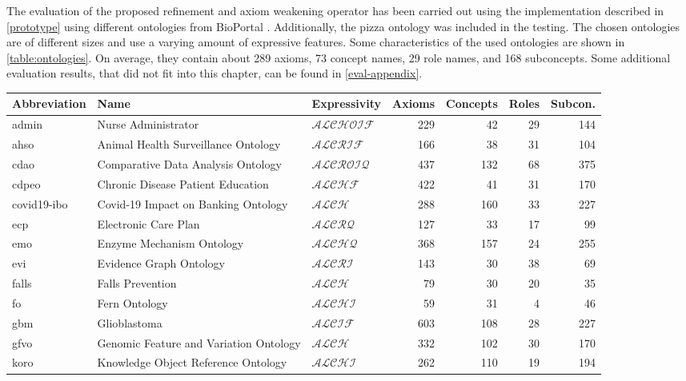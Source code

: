 
The evaluation of the proposed refinement and axiom weakening operator has been carried out using the implementation described in \cref{prototype} using different ontologies from BioPortal \cite{whetzel2011bioportal,bioportal}. Additionally, the pizza ontology \cite{pizzaontology} was included in the testing. The chosen ontologies are of different sizes and use a varying amount of expressive features. Some characteristics of the used ontologies are shown in \cref{table:ontologies}. On average, they contain about 289 axioms, 73 concept names, 29 role names, and 168 subconcepts. Some additional evaluation results, that did not fit into this chapter, can be found in \cref{eval-appendix}.

\begin{table}[ht]
  \scriptsize
  \centering
  \addtolength{\tabcolsep}{-0.75mm}
  \begin{tabular}{|l|llrrrr|}
    \hline
    Abbreviation & Name & Expressivity & Axioms & Concepts & Roles & Subcon. \\
    \hline
    admin & Nurse Administrator & $\mathcal{ALCHOIF}$ & 229 & 42 & 29 & 144 \\
    ahso & Animal Health Surveillance Ontology & $\mathcal{ALCRIF}$ & 166 & 38 & 31 & 104 \\
    cdao & Comparative Data Analysis Ontology & $\mathcal{ALCROIQ}$ & 437 & 132 & 68 & 375 \\
    cdpeo & Chronic Disease Patient Education & $\mathcal{ALCHF}$ & 422 & 41 & 31 & 170 \\
    covid19-ibo & Covid-19 Impact on Banking Ontology & $\mathcal{ALCH}$ & 288 & 160 & 33 & 227 \\
    ecp & Electronic Care Plan & $\mathcal{ALCRQ}$ & 127 & 33 & 17 & 99 \\
    emo & Enzyme Mechanism Ontology & $\mathcal{ALCHQ}$ & 368 & 157 & 24 & 255 \\
    evi & Evidence Graph Ontology & $\mathcal{ALCRI}$ & 143 & 30 & 38 & 69 \\
    falls & Falls Prevention & $\mathcal{ALCH}$ & 79 & 30 & 20 & 35 \\
    fo & Fern Ontology & $\mathcal{ALCHI}$ & 59 & 31 & 4 & 46 \\
    gbm & Glioblastoma & $\mathcal{ALCIF}$ & 603 & 108 & 28 & 227 \\
    gfvo & Genomic Feature and Variation Ontology & $\mathcal{ALCH}$ & 332 & 102 & 30 & 170 \\
    koro & Knowledge Object Reference Ontology & $\mathcal{ALCHI}$ & 262 & 110 & 19 & 194 \\

\end{tabular}
\end{table}
